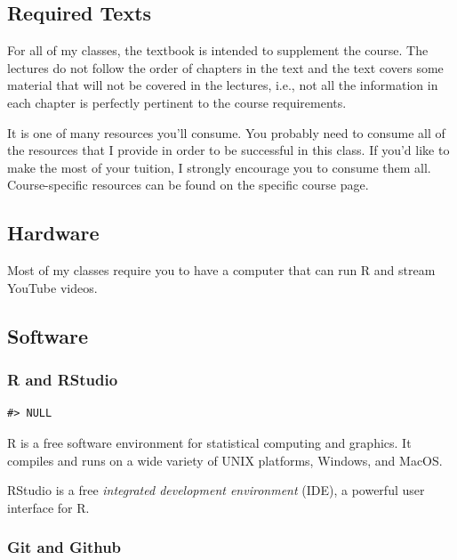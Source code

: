 \hypertarget{required-texts}{%
\subsection{Required Texts}\label{required-texts}}

For all of my classes, the textbook is intended to supplement the course. The lectures do not follow the order of chapters in the text and the text covers some material that will not be covered in the lectures, i.e., not all the information in each chapter is perfectly pertinent to the course requirements.

It is one of many resources you'll consume.
You probably need to consume all of the resources that I provide in order to be successful in this class. If you'd like to make the most of your tuition, I strongly encourage you to consume them all. Course-specific resources can be found on the specific course page.

\hypertarget{hardware}{%
\subsection{Hardware}\label{hardware}}

Most of my classes require you to have a computer that can run R and stream YouTube videos.

\hypertarget{software}{%
\subsection{Software}\label{software}}

\hypertarget{r-and-rstudio}{%
\subsubsection{R and RStudio}\label{r-and-rstudio}}

\begin{verbatim}
#> NULL
\end{verbatim}

R is a free software environment for statistical computing and graphics. It compiles and runs on a wide variety of UNIX platforms, Windows, and MacOS.

RStudio is a free \emph{integrated development environment} (IDE), a powerful user interface for R.

\hypertarget{git-and-github}{%
\subsubsection{Git and Github}\label{git-and-github}}

